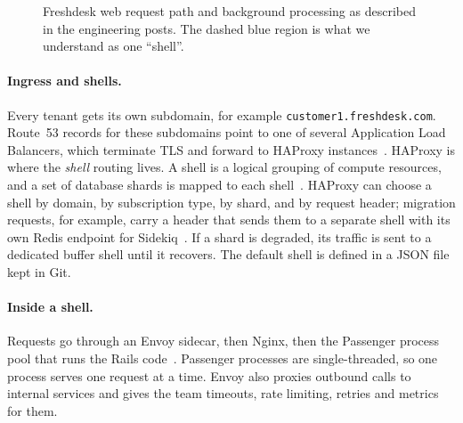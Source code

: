 \documentclass[10pt,a4paper]{article}
\newcommand{\code}[1]{\texttt{#1}}
\begin{document}
\begin{figure}[t]
\caption{Freshdesk web request path and background processing as described in the engineering posts. The dashed blue region is what we understand as one ``shell''.}\label{fig:arch}
\end{figure}

\paragraph{Ingress and shells.} Every tenant gets its own subdomain, for example \code{customer1.freshdesk.com}. Route~53 records for these subdomains point to one of several Application Load Balancers, which terminate TLS and forward to HAProxy instances~\cite{kumar2020}. HAProxy is where the \emph{shell} routing lives. A shell is a logical grouping of compute resources, and a set of database shards is mapped to each shell~\cite{mallapu2021,srinivasan2023}. HAProxy can choose a shell by domain, by subscription type, by shard, and by request header; migration requests, for example, carry a header that sends them to a separate shell with its own Redis endpoint for Sidekiq~\cite{mallapu2021}. If a shard is degraded, its traffic is sent to a dedicated buffer shell until it recovers. The default shell is defined in a JSON file kept in Git.

\paragraph{Inside a shell.} Requests go through an Envoy sidecar, then Nginx, then the Passenger process pool that runs the Rails code~\cite{kumar2020}. Passenger processes are single-threaded, so one process serves one request at a time. Envoy also proxies outbound calls to internal services and gives the team timeouts, rate limiting, retries and metrics for them.
\end{document}
